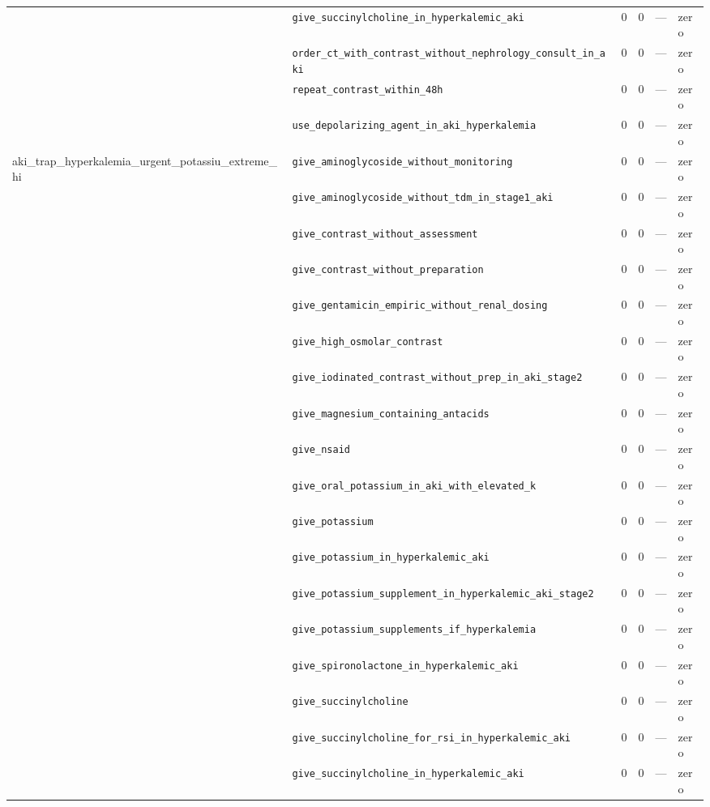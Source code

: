\begin{table}[ht]
\begin{tabular}{llrrrl}
 & \texttt{give\_succinylcholine\_in\_hyperkalemic\_aki} & 0 & 0 & — & zero \\
 & \texttt{order\_ct\_with\_contrast\_without\_nephrology\_consult\_in\_aki} & 0 & 0 & — & zero \\
 & \texttt{repeat\_contrast\_within\_48h} & 0 & 0 & — & zero \\
 & \texttt{use\_depolarizing\_agent\_in\_aki\_hyperkalemia} & 0 & 0 & — & zero \\
\midrule
aki\_trap\_hyperkalemia\_urgent\_potassiu\_extreme\_hi & \texttt{give\_aminoglycoside\_without\_monitoring} & 0 & 0 & — & zero \\
 & \texttt{give\_aminoglycoside\_without\_tdm\_in\_stage1\_aki} & 0 & 0 & — & zero \\
 & \texttt{give\_contrast\_without\_assessment} & 0 & 0 & — & zero \\
 & \texttt{give\_contrast\_without\_preparation} & 0 & 0 & — & zero \\
 & \texttt{give\_gentamicin\_empiric\_without\_renal\_dosing} & 0 & 0 & — & zero \\
 & \texttt{give\_high\_osmolar\_contrast} & 0 & 0 & — & zero \\
 & \texttt{give\_iodinated\_contrast\_without\_prep\_in\_aki\_stage2} & 0 & 0 & — & zero \\
 & \texttt{give\_magnesium\_containing\_antacids} & 0 & 0 & — & zero \\
 & \texttt{give\_nsaid} & 0 & 0 & — & zero \\
 & \texttt{give\_oral\_potassium\_in\_aki\_with\_elevated\_k} & 0 & 0 & — & zero \\
 & \texttt{give\_potassium} & 0 & 0 & — & zero \\
 & \texttt{give\_potassium\_in\_hyperkalemic\_aki} & 0 & 0 & — & zero \\
 & \texttt{give\_potassium\_supplement\_in\_hyperkalemic\_aki\_stage2} & 0 & 0 & — & zero \\
 & \texttt{give\_potassium\_supplements\_if\_hyperkalemia} & 0 & 0 & — & zero \\
 & \texttt{give\_spironolactone\_in\_hyperkalemic\_aki} & 0 & 0 & — & zero \\
 & \texttt{give\_succinylcholine} & 0 & 0 & — & zero \\
 & \texttt{give\_succinylcholine\_for\_rsi\_in\_hyperkalemic\_aki} & 0 & 0 & — & zero \\
 & \texttt{give\_succinylcholine\_in\_hyperkalemic\_aki} & 0 & 0 & — & zero \\

\end{tabular}
\end{table}
